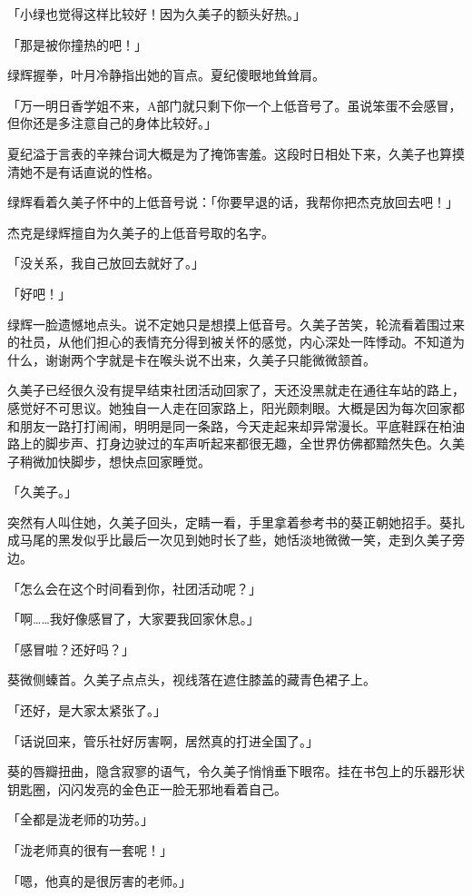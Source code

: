 \documentclass[UTF8]{ctexart}
\begin{document}
    「小绿也觉得这样比较好！因为久美子的额头好热。」 

    「那是被你撞热的吧！」 

    绿辉握拳，叶月冷静指出她的盲点。夏纪傻眼地耸耸肩。 

    「万一明日香学姐不来，A部门就只剩下你一个上低音号了。虽说笨蛋不会感冒，但你还是多注意自己的身体比较好。」 

    夏纪溢于言表的辛辣台词大概是为了掩饰害羞。这段时日相处下来，久美子也算摸清她不是有话直说的性格。 

    绿辉看着久美子怀中的上低音号说：「你要早退的话，我帮你把杰克放回去吧！」 

    杰克是绿辉擅自为久美子的上低音号取的名字。 

    「没关系，我自己放回去就好了。」 

    「好吧！」 

    绿辉一脸遗憾地点头。说不定她只是想摸上低音号。久美子苦笑，轮流看着围过来的社员，从他们担心的表情充分得到被关怀的感觉，内心深处一阵悸动。不知道为什么，谢谢两个字就是卡在喉头说不出来，久美子只能微微颔首。 

    久美子已经很久没有提早结束社团活动回家了，天还没黑就走在通往车站的路上，感觉好不可思议。她独自一人走在回家路上，阳光颇刺眼。大概是因为每次回家都和朋友一路打打闹闹，明明是同一条路，今天走起来却异常漫长。平底鞋踩在柏油路上的脚步声、打身边驶过的车声听起来都很无趣，全世界仿佛都黯然失色。久美子稍微加快脚步，想快点回家睡觉。 

    「久美子。」 

    突然有人叫住她，久美子回头，定睛一看，手里拿着参考书的葵正朝她招手。葵扎成马尾的黑发似乎比最后一次见到她时长了些，她恬淡地微微一笑，走到久美子旁边。 

    「怎么会在这个时间看到你，社团活动呢？」 

    「啊……我好像感冒了，大家要我回家休息。」 

    「感冒啦？还好吗？」 

    葵微侧螓首。久美子点点头，视线落在遮住膝盖的藏青色裙子上。 

    「还好，是大家太紧张了。」 

    「话说回来，管乐社好厉害啊，居然真的打进全国了。」 

    葵的唇瓣扭曲，隐含寂寥的语气，令久美子悄悄垂下眼帘。挂在书包上的乐器形状钥匙圈，闪闪发亮的金色正一脸无邪地看着自己。 

    「全都是泷老师的功劳。」 

    「泷老师真的很有一套呢！」 

    「嗯，他真的是很厉害的老师。」 
\end{document}
